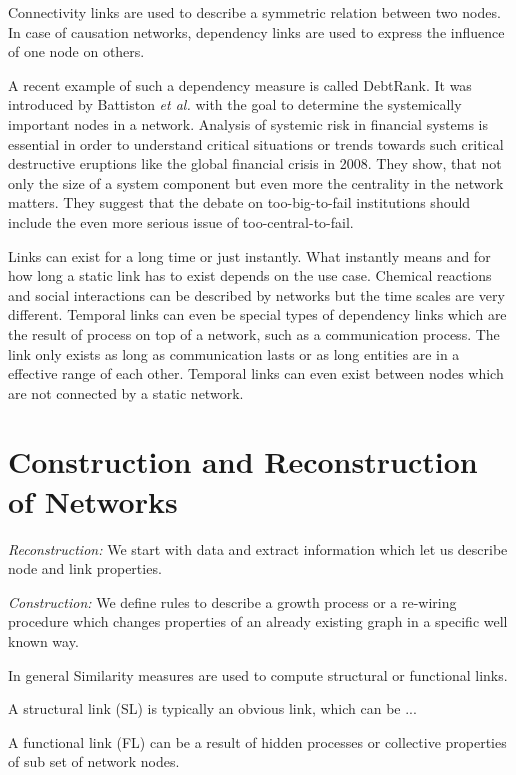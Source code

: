 \documentclass[a4paper,10pt]{scrbook}
\begin{document}
Connectivity links are used to describe a symmetric relation between two nodes. In case of causation networks, dependency links are used to express the influence of one node on others.

%
A recent example of such a dependency measure is called DebtRank. It was introduced by Battiston \textit{et al.} \cite{Battiston2012} with the goal to determine the systemically important nodes in a network. Analysis of systemic risk in financial systems is essential in order to understand critical situations or trends towards such critical destructive eruptions like the global financial crisis in 2008. They show, that not only the size of a system component but even more the centrality in the network matters. They suggest that the debate on too-big-to-fail institutions should include the even more serious issue of too-central-to-fail.

Links can exist for a long time or just instantly. What instantly means and for how long a static link has to exist depends on the use case. Chemical reactions and social interactions can be described by networks but the time scales are very different. Temporal links can even be special types of dependency links which are the result of process on top of a network, such as a communication process. The link only exists as long as communication lasts or as long entities are in a effective range of each other. Temporal links can even exist between nodes which are not connected by a static network.

\section{Construction and Reconstruction of Networks}

\textit{Reconstruction:} We start with data and extract information which let us describe node and link properties.

\textit{Construction:} We define rules to describe a growth process or a re-wiring procedure which changes properties of an already existing graph in a specific well known way. 
  
In general Similarity measures are used to compute structural or functional links. 

A structural link (SL) is typically an obvious link, which can be  ...

A functional link (FL) can be a result of hidden processes or collective properties of sub set of network nodes.  
\end{document}
